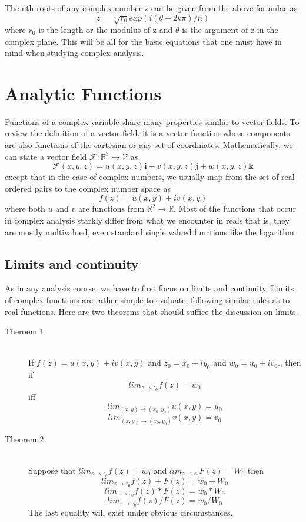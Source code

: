 \documentclass[11pt]{article}
\begin{document}
\begin{sloppypar}
The nth roots of any complex number z can be given from the above forumlae as
\begin{equation}
	z = \sqrt[n]{r_{0}} exp(i(\theta+2k\pi)/n)
\end{equation}
where $r_{0}$ is the length or the modulus of z and $\theta$ is the argument of z in the complex plane. This will be all for the basic equations that one must have in mind when studying complex analysis. 

\section{Analytic Functions}
Functions of a complex variable share many properties similar to vector fields. To review the definition of a vector field, it is a vector function whose components are also functions of the cartesian or any set of coordinates. Mathematically, we can state a vector field $\mathcal{F}: \mathbb{R}^{3} \rightarrow \mathcal{V}$ as,
$$\mathcal{F}(x,y,z) = u(x,y,z)\mathbf{i} + v(x,y,z)\mathbf{j} + w(x,y,z)\mathbf{k}$$
except that in the case of complex numbers, we usually map from the set of real ordered pairs to the complex number space as 
$$f(z) = u(x,y)+iv(x,y)$$ where both $u$ and $v$ are functions from $\mathbb{R}^{2} \to \mathbb{R}$. Most of the functions that occur in complex analysis starkly differ from what we encounter in reals that is, they are mostly multivalued, even standard single valued functions like the logarithm. 

\subsection{Limits and continuity}
As in any analysis course, we have to first focus on limits and continuity. Limits of complex functions are rather simple to evaluate, following similar rules as to real functions. Here are two theorems that should suffice the discussion on limits.
\begin{description}
\item[Theroem 1] \hfill \\
	If $f(z) =  u(x,y)+iv(x,y)$ and $z_{0} = x_{0}+iy_{0}$ and $w_{0} = u_{0} + iv_{0}$., then if 
	$$lim_{z \to z_{0}} f(z) = w_{0}$$ iff
	$$lim_{(x,y) \to (x_{0},y_{0})} u(x,y) = u_{0}$$ $$lim_{(x,y) \to (x_{0},y_{0})} v(x,y) = v_{0}$$
\item[Theorem 2] \hfill \\
	Suppose that $lim_{z \to z_{0}} f(z) = w_{0}$ and $lim_{z \to z_{0}} F(z) = W_{0}$ then
	$$lim_{z \to z_{0}} f(z) + F(z) = w_{0} + W_{0}$$
	$$lim_{z \to z_{0}} f(z)*F(z) = w_{0}*W_{0}$$
	$$lim_{z \to z_{0}} f(z)/F(z) = w_{0}/W_{0}$$
The last equality will exist under obvious circumstances. 
\end{description}


\end{sloppypar}
\end{document}
